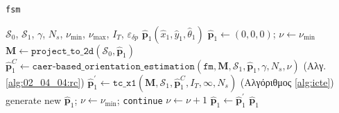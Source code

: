 \begin{algorithm}
  \caption{\texttt{fsm}}
  \begin{spacing}{1.2}
  \begin{algorithmic}[1]
    \REQUIRE $\mathcal{S}_0$, $\mathcal{S}_1$, $\gamma$, $N_s$, $\nu_{\min}$, $\nu_{\max}$, $I_T$, $\varepsilon_{\delta p}$
    \ENSURE $\hat{\bm{p}}_1(\hat{x}_1, \hat{y}_1, \hat{\theta}_1)$
    \STATE $\hat{\bm{p}}_1 \leftarrow (0,0,0)$; $\nu \leftarrow \nu_{\min}$
    \STATE $\bm{M} \leftarrow \texttt{project\_to\_2d}(\mathcal{S}_0, \hat{\bm{p}}_1)$
    \WHILE {$\nu \leq \nu_{\max}$}
      \STATE $\hat{\bm{p}}_1^C\leftarrow \texttt{caer-based\_orientation\_estimation}(\texttt{fm}, \bm{M}, \mathcal{S}_1, \hat{\bm{p}}_1, \gamma, N_s, \nu)$ \hfill (Αλγ. \ref{alg:02_04_04:rc})
      \STATE $\hat{\bm{p}}_1^{\prime} \leftarrow \texttt{tc\_x1}(\bm{M}, \mathcal{S}_1, \hat{\bm{p}}_1^C, I_T, \infty, N_s)$  \hfill (Αλγόριθμος \ref{alg:icte})
        \STATE generate new $\hat{\bm{p}}_1$; $\nu \leftarrow \nu_{\min}$; \texttt{continue}
      \ENDIF
        \STATE $\nu \leftarrow \nu + 1$
      \ENDIF
      \STATE $\hat{\bm{p}}_1 \leftarrow \hat{\bm{p}}_1^{\prime}$
    \ENDWHILE
    \RETURN $\hat{\bm{p}}_1$
  \end{algorithmic}
  \end{spacing}
  \label{alg:algorithm_fsm}
\end{algorithm}
